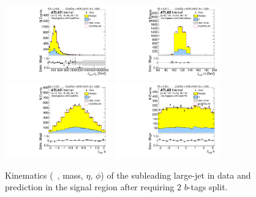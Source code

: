 \begin{figure}[htb!]
\begin{center}
\includegraphics[width=0.41\textwidth,angle=-90]{figures/boosted/Signal/b77_TwoTag_split_Signal_sublHCand_Pt_m.pdf}
\includegraphics[width=0.41\textwidth,angle=-90]{figures/boosted/Signal/b77_TwoTag_split_Signal_sublHCand_Mass_s.pdf}\\
\includegraphics[width=0.41\textwidth,angle=-90]{figures/boosted/Signal/b77_TwoTag_split_Signal_sublHCand_Eta.pdf}
\includegraphics[width=0.41\textwidth,angle=-90]{figures/boosted/Signal/b77_TwoTag_split_Signal_sublHCand_Phi.pdf}
  \caption{Kinematics (\pt~, mass, $\eta$, $\phi$) of the subleading large-\R jet in data and prediction in the signal region after requiring 2 $b$-tags split. }
  \label{fig:boosted-2bs-signal-ak10-subl}
\end{center}
\end{figure}

